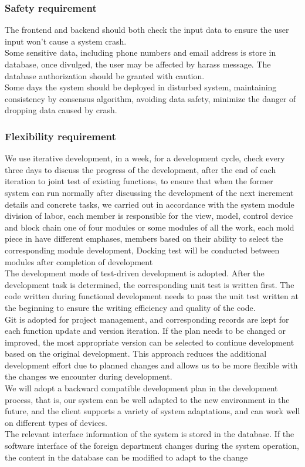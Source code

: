 \documentclass[16pt]{scrreprt}
\begin{document}
\subsubsection{Safety requirement}
The frontend and backend should both check the input data to ensure the user input won't cause a system crash.\\
Some sensitive data, including phone numbers and email address is store in database, once divulged, the user may be affected by harass message. The database authorization should be granted with caution.\\ 
Some days the system should be deployed in disturbed system, maintaining consistency by consensus algorithm, avoiding data safety, minimize the danger of dropping data caused by crash.\\

\subsubsection{Flexibility requirement}
We use iterative development, in a week, for a development cycle, check every three days to discuss the progress of the development, after the end of each iteration to joint test of existing functions, to ensure that when the former system can run normally after discussing the development of the next increment details and concrete tasks, we carried out in accordance with the system module division of labor, each member is responsible for the view, model, control device and block chain one of four modules or some modules of all the work, each mold piece in have different emphases, members based on their ability to select the corresponding module development,
Docking test will be conducted between modules after completion of development\\
The development mode of test-driven development is adopted. After the development task is determined, the corresponding unit test is written first. The code written during functional development needs to pass the unit test written at the beginning to ensure the writing efficiency and quality of the code.\\
Git is adopted for project management, and corresponding records are kept for each function update and version iteration. If the plan needs to be changed or improved, the most appropriate version can be selected to continue development based on the original development.
This approach reduces the additional development effort due to planned changes and allows us to be more flexible with the changes we encounter during development.\\
We will adopt a backward compatible development plan in the development process, that is, our system can be well adapted to the new environment in the future, and the client supports a variety of system adaptations, and can work well on different types of devices.\\
The relevant interface information of the system is stored in the database. If the software interface of the foreign department changes during the system operation, the content in the database can be modified to adapt to the change\\
\end{document}
